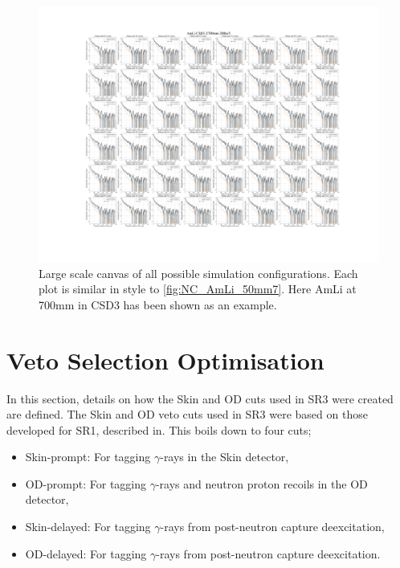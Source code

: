 \begin{figure}
    \centering
    \includegraphics[width=\linewidth]{figures/VetoEfficiency/AmLi_CSD3_Z700mm_200keV.png}
    \caption{Large scale canvas of all possible simulation configurations. Each plot is similar in style to \autoref{fig:NC_AmLi_50mm7}. Here AmLi at 700mm in CSD3 has been shown as an example.}
    \label{fig:NC_Canvas}
\end{figure}

\section{Veto Selection Optimisation}
In this section, details on how the Skin and OD cuts used in SR3 were created are defined.
The Skin and OD veto cuts used in SR3 were based on those developed for SR1, described in\cite{LZ_AnalysisDocDB000071:xe127_skin_tagging, LZ_AnalysisDocDB000106:sr1_analysis_cuts, LZ_AnalysisDocDB000122:sr1_tuning_analysis}.
This boils down to four cuts;
\begin{itemize}
    \item Skin-prompt: For tagging $\gamma$-rays in the Skin detector,
    \item OD-prompt: For tagging $\gamma$-rays and neutron proton recoils in the OD detector,
    \item Skin-delayed: For tagging $\gamma$-rays from post-neutron capture deexcitation,
    \item OD-delayed: For tagging $\gamma$-rays from post-neutron capture deexcitation.
\end{itemize}

